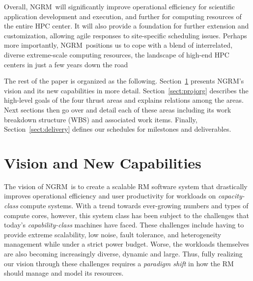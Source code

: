 \documentclass{article}
\newcommand{\ngrm}{NGRM}
\begin{document}
Overall, \ngrm\ will significantly improve operational efficiency for
scientific application development and execution, and further for computing
resources of the entire HPC center.  It will also provide
a foundation for further extension and customization, allowing agile responses
to site-specific scheduling issues. Perhaps more importantly, \ngrm\
positions us to cope with a blend of interrelated, diverse
extreme-scale computing resources, the landscape of high-end HPC centers
in just a few years down the road

The rest of the paper is organized as the following.
Section~\ref{sect:vision} presents \ngrm's vision and 
its new capabilities in more detail. Section~\ref{sect:projorg}  
describes the high-level goals of the four thrust areas and
explains relations among the areas. Next sections then 
go over and detail each of these areas including 
its work breakdown structure (WBS) and associated work items.
Finally, Section~\ref{sect:delivery} defines
our schedules for milestones and deliverables.


\section{Vision and New Capabilities}
\label{sect:vision}

The vision of \ngrm\ is to create a scalable RM software system that 
drastically improves operational efficiency and user productivity 
for workloads on {\em capacity-class} compute systems.
With a trend towards ever-growing numbers and types of compute cores, however,
this system class has been subject to the challenges that
today's {\em capability-class} machines have faced. 
These challenges include having to provide extreme scalability, low noise, 
fault tolerance, and heterogeneity management while under a strict power budget.
Worse, the workloads themselves are also becoming increasingly diverse, 
dynamic and large. Thus, fully realizing our vision through these challenges requires
a {\em paradigm shift} in how the RM should manage and model its resources.
\end{document}
